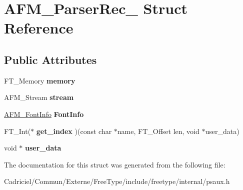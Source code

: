 \hypertarget{struct_a_f_m___parser_rec__}{}\section{A\+F\+M\+\_\+\+Parser\+Rec\+\_\+ Struct Reference}
\label{struct_a_f_m___parser_rec__}
\subsection*{Public Attributes}
\begin{DoxyCompactItemize}
\item 
F\+T\+\_\+\+Memory {\bfseries memory}\hypertarget{struct_a_f_m___parser_rec___a3fec8b1760fa9261f48ee87dc2b3858b}{}\label{struct_a_f_m___parser_rec___a3fec8b1760fa9261f48ee87dc2b3858b}

\item 
A\+F\+M\+\_\+\+Stream {\bfseries stream}\hypertarget{struct_a_f_m___parser_rec___adf3b1165216cbd1f7ec7ae736fd4270a}{}\label{struct_a_f_m___parser_rec___adf3b1165216cbd1f7ec7ae736fd4270a}

\item 
\hyperlink{struct_a_f_m___font_info_rec__}{A\+F\+M\+\_\+\+Font\+Info} {\bfseries Font\+Info}\hypertarget{struct_a_f_m___parser_rec___ae53d6cddac32a0eb7014c3a9f74517df}{}\label{struct_a_f_m___parser_rec___ae53d6cddac32a0eb7014c3a9f74517df}

\item 
F\+T\+\_\+\+Int($\ast$ {\bfseries get\+\_\+index} )(const char $\ast$name, F\+T\+\_\+\+Offset len, void $\ast$user\+\_\+data)\hypertarget{struct_a_f_m___parser_rec___a9d33b62410351d72878f0f14007e7385}{}\label{struct_a_f_m___parser_rec___a9d33b62410351d72878f0f14007e7385}

\item 
void $\ast$ {\bfseries user\+\_\+data}\hypertarget{struct_a_f_m___parser_rec___a9fa78a781737bf27e00448c5092b7657}{}\label{struct_a_f_m___parser_rec___a9fa78a781737bf27e00448c5092b7657}

\end{DoxyCompactItemize}


The documentation for this struct was generated from the following file\+:\begin{DoxyCompactItemize}
\item 
Cadriciel/\+Commun/\+Externe/\+Free\+Type/include/freetype/internal/psaux.\+h\end{DoxyCompactItemize}
